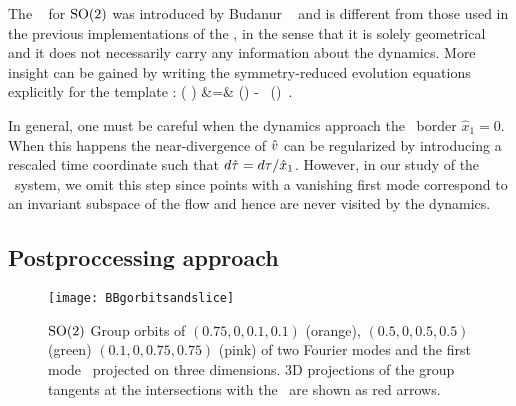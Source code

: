 The \template\  for $\textrm{SO}(2)$ was introduced by Budanur \etal~
and is different from those used in the previous implementations
of the \mslices, in the sense that it is solely geometrical and it does
not necessarily carry any information about the dynamics. More insight can be
gained by writing the symmetry-reduced evolution equations 
explicitly for the template :
\bea
\velRed ( \sspRed )          &=& \vel(\sspRed)
   -  \, \groupTan(\sspRed)
\label{e-so2red1stmode}
\,.
\eea


In general, one must be careful when the dynamics approach the \slice\ border $\hat{x}_1 = 0$. When this happens 
the near-divergence of $\hat{v}$ can be regularized by introducing a rescaled time coordinate such that
$d\hat{\tau} = d\tau / \hat{x}_1$. However, in our study of the \twoMode\ system, we omit this
step since points with a vanishing first mode correspond to an invariant subspace of the flow and hence are never visited by the dynamics.

\subsection{Postproccessing approach}
\label{s-slice2modes}


\begin{figure}%
\centering
 \texttt{[image: BBgorbitsandslice]}
\caption{$\textrm{SO}(2)$ Group orbits of $(0.75, 0, 0.1, 0.1)$ (orange), $(0.5, 0, 0.5, 0.5)$ (green)
$(0.1, 0, 0.75, 0.75)$ (pink) of two Fourier modes and the first mode \slicePlane\
projected on three dimensions. 3D projections of the group tangents at the
intersections with the \slicePlane\ are shown as red arrows.}
\label{fig:BBgorbitsandslice}
\end{figure}

